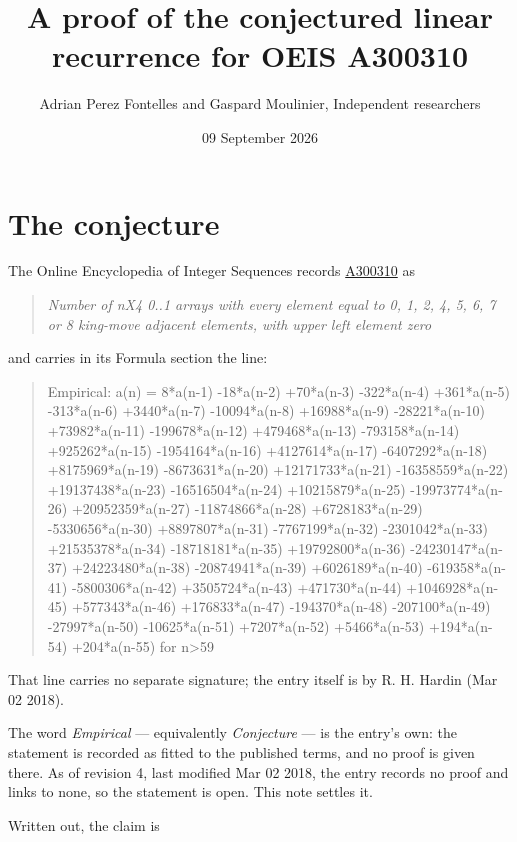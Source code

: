 \documentclass[11pt]{article}
\title{A proof of the conjectured linear recurrence for OEIS A300310}
\author{Adrian Perez Fontelles and Gaspard Moulinier, Independent researchers}
\date{09 September 2026}
\theoremstyle{definition}
\begin{document}
\maketitle
\section{The conjecture}

The Online Encyclopedia of Integer Sequences records \href{https://oeis.org/A300310}{A300310} as

\begin{quote}\itshape Number of nX4 0..1 arrays with every element equal to 0, 1, 2, 4, 5, 6, 7 or 8 king-move adjacent elements, with upper left element zero\end{quote}

and carries in its Formula section the line:

\begin{quote}\ttfamily Empirical: a(n) = 8*a(n-1) -18*a(n-2) +70*a(n-3) -322*a(n-4) +361*a(n-5) -313*a(n-6) +3440*a(n-7) -10094*a(n-8) +16988*a(n-9) -28221*a(n-10) +73982*a(n-11) -199678*a(n-12) +479468*a(n-13) -793158*a(n-14) +925262*a(n-15) -1954164*a(n-16) +4127614*a(n-17) -6407292*a(n-18) +8175969*a(n-19) -8673631*a(n-20) +12171733*a(n-21) -16358559*a(n-22) +19137438*a(n-23) -16516504*a(n-24) +10215879*a(n-25) -19973774*a(n-26) +20952359*a(n-27) -11874866*a(n-28) +6728183*a(n-29) -5330656*a(n-30) +8897807*a(n-31) -7767199*a(n-32) -2301042*a(n-33) +21535378*a(n-34) -18718181*a(n-35) +19792800*a(n-36) -24230147*a(n-37) +24223480*a(n-38) -20874941*a(n-39) +6026189*a(n-40) -619358*a(n-41) -5800306*a(n-42) +3505724*a(n-43) +471730*a(n-44) +1046928*a(n-45) +577343*a(n-46) +176833*a(n-47) -194370*a(n-48) -207100*a(n-49) -27997*a(n-50) -10625*a(n-51) +7207*a(n-52) +5466*a(n-53) +194*a(n-54) +204*a(n-55) for n>59\end{quote}

That line carries no separate signature; the entry itself is by R. H. Hardin (Mar 02 2018).

The word {\itshape Empirical} --- equivalently {\itshape Conjecture} --- is the entry's own: the statement is recorded as fitted to the published terms, and no proof is given there. As of revision 4, last modified Mar 02 2018, the entry records no proof and links to none, so the statement is open. This note settles it.

Written out, the claim is
\end{document}
